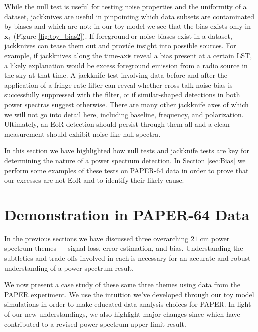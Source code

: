 \documentclass[preprint2,numberedappendix,tighten]{aastex6}  %
\begin{document}
While the null test is useful for testing noise properties and the uniformity of a dataset, jackknives are useful in pinpointing which data subsets are contaminated by biases and which are not; in our toy model we see that the bias exists only in $\textbf{x}_{1}$ (Figure \ref{fig:toy_bias2}). If foreground or noise biases exist in a dataset, jackknives can tease them out and provide insight into possible sources. For example, if jackknives along the time-axis reveal a bias present at a certain LST, a likely explanation would be excess foreground emission from a radio source in the sky at that time. A jackknife test involving data before and after the application of a fringe-rate filter can reveal whether cross-talk noise bias is successfully suppressed with the filter, or if similar-shaped detections in both power spectras suggest otherwise. There are many other jackknife axes of which we will not go into detail here, including baseline, frequency, and polarization. Ultimately, an EoR detection should persist through them all and a clean measurement should exhibit noise-like null spectra.

In this section we have highlighted how null tests and jackknife tests are key for determining the nature of a power spectrum detection. In Section \ref{sec:Bias} we perform some examples of these tests on PAPER-64 data in order to prove that our excesses are not EoR and to identify their likely cause. 


\section{Demonstration in PAPER-64 Data}
\label{sec:CaseStudy}

In the previous sections we have discussed three overarching $21$ cm power spectrum themes --- signal loss, error estimation, and bias. Understanding the subtleties and trade-offs involved in each is necessary for an accurate and robust understanding of a power spectrum result. 

We now present a case study of these same three themes using data from the PAPER experiment. We use the intuition we've developed through our toy model simulations in order to make educated data analysis choices for PAPER. In light of our new understandings, we also highlight major changes since \citet{ali_et_al2015} which have contributed to a revised power spectrum upper limit result.
\end{document}
